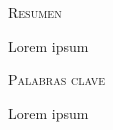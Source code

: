 \begin{spanish}
{\scshape\Large Resumen\par}
\vspace{0.5cm}
Lorem ipsum

\vspace{1cm}

{\scshape\Large Palabras clave\par}
\vspace{0.5cm}
Lorem ipsum
\end{spanish}

\afterpage{\blankpage}
\cleardoublepage
